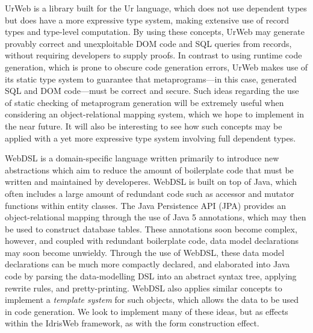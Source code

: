 Ur\/Web \cite{urweb} is a library built for the Ur language, which does not use dependent types but does have a more expressive type system, making extensive use of record types and type-level computation.
By using these concepts, Ur\/Web may generate provably correct and unexploitable DOM code and SQL queries from records, without requiring developers to supply proofs. 
In contrast to using runtime code generation, which is prone to obscure code generation errors, Ur\/Web makes use of its static type system to guarantee that metaprograms---in this case, generated SQL and DOM code---must be correct and secure.
Such ideas regarding the use of static checking of metaprogram generation will be extremely useful when considering an object-relational mapping system, which we hope to implement in the near future. It will also be interesting to see how such concepts may be applied with a yet more expressive type system involving full dependent types.

WebDSL \cite{webdsl} is a domain-specific language written primarily to
introduce new abstractions which aim to reduce the amount of boilerplate code
that must be written and maintained by developeres. WebDSL is built on top of
Java, which often includes a large amount of redundant code such as accessor
and mutator functions within entity classes. The Java Persistence API (JPA)
\cite{jpa} provides an object-relational mapping through the use of Java 5
annotations, which may then be used to construct database tables. These
annotations soon become complex, however, and coupled with redundant
boilerplate code, data model declarations may soon become unwieldy. Through the
use of WebDSL, these data model declarations can be much more compactly
declared, and elaborated into Java code by parsing the data-modelling DSL into
an abstract syntax tree, applying rewrite rules, and pretty-printing. WebDSL
also applies similar concepts to implement a \textit{template system} for such
objects, which allows the data to be used in code generation. We look to
implement many of these ideas, but as effects within the IdrisWeb
framework, as with the form construction effect.

